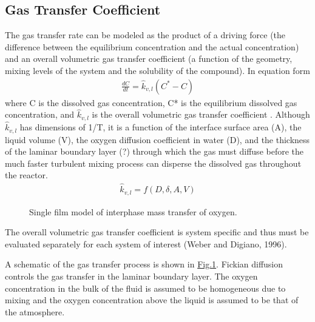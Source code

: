 \documentclass[letterpaper,10pt,english]{sphinxmanual}
\let\sphinxpxdimen\pdfpxdimen\else\newdimen\sphinxpxdimen
\begin{document}
\subsection{Gas Transfer Coefficient}
\label{\detokenize{Gas_Transfer/Gas_Transfer:gas-transfer-coefficient}}\label{\detokenize{Gas_Transfer/Gas_Transfer:heading-gas-transfer-coefficient}}
The gas transfer rate can be modeled as the product of a driving force (the difference between the equilibrium concentration and the actual concentration) and an overall volumetric gas transfer coefficient (a function of the geometry, mixing levels of the system and the solubility of the compound). In equation form
\begin{equation}\label{equation:Gas_Transfer/Gas_Transfer:eq_Gas_first_order}
\begin{split}\frac{dC}{dt} =\hat{k}_{v,l} \left(C^{*} -C\right)\end{split}
\end{equation}
where C is the dissolved gas concentration, C* is the equilibrium dissolved gas concentration, and \(\hat{k}_{v,l}\) is the overall volumetric gas transfer coefficient . Although \(\hat{k}_{v,l}\) has dimensions of 1/T, it is a function of the interface surface area (A), the liquid volume (V), the oxygen diffusion coefficient in water (D), and the thickness of the laminar boundary layer (?) through which the gas must diffuse before the much faster turbulent mixing process can disperse the dissolved gas throughout the reactor.
\begin{equation}\label{equation:Gas_Transfer/Gas_Transfer:Gas_Transfer/Gas_Transfer:0}
\begin{split}\hat{k}_{v,l} =f(D,\delta ,A,V)\end{split}
\end{equation}
\begin{figure}[htbp]
\centering
\capstart

\noindent\sphinxincludegraphics[width=300\sphinxpxdimen]{{Single_film_model}.png}
\caption{Single film model of interphase mass transfer of oxygen.}\label{\detokenize{Gas_Transfer/Gas_Transfer:id3}}\label{\detokenize{Gas_Transfer/Gas_Transfer:figure-single-film-model}}\end{figure}

The overall volumetric gas transfer coefficient is system specific and thus must be evaluated separately for each system of interest (Weber and Digiano, 1996).

A schematic of the gas transfer process is shown in \hyperref[\detokenize{Gas_Transfer/Gas_Transfer:figure-single-film-model}]{Fig.\@ \ref{\detokenize{Gas_Transfer/Gas_Transfer:figure-single-film-model}}}. Fickian diffusion controls the gas transfer in the laminar boundary layer. The oxygen concentration in the bulk of the fluid is assumed to be homogeneous due to mixing and the oxygen concentration above the liquid is assumed to be that of the atmosphere.
\end{document}
